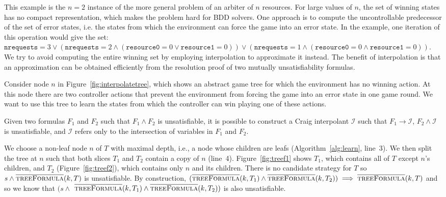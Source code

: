 This example is the $n=2$ instance of the more general problem of an arbiter of $n$ resources. For large values of $n$, the set of winning states has no compact representation, which makes the problem hard for BDD solvers. One approach is to compute the uncontrollable predecessor of the set of error states, i.e. the states from which the environment can force the game into an error state. In the example, one iteration of this operation would give the set: $\texttt{nrequests} = 3 \lor (\texttt{nrequests} = 2 \land ( \texttt{resource0} = 0 \lor \texttt{resource1} = 0)) \lor (\texttt{nrequests} = 1 \land (\texttt{resource0} = 0 \land \texttt{resource1} = 0))$. We try to avoid computing the entire winning set by employing interpolation to approximate it instead. The benefit of interpolation is that an approximation can be obtained efficiently from the resolution proof of two mutually unsatisfiability formulas.

Consider node $n$ in Figure~\ref{fig:interpolatetree}, which shows an abstract game tree for which the environment has no winning action. At this node there are two controller actions that prevent the environment from forcing the game into an error state in one game round. We want to use this tree to learn the states from which the controller can win playing one of these actions.

Given two formulas $F_1$ and $F_2$ such that $F_1 \land F_2$ is unsatisfiable, it is possible to construct a Craig interpolant $\mathcal{I}$ such that $F_1 \to \mathcal{I}$, $F_2 \land \mathcal{I}$ is unsatisfiable, and $\mathcal{I}$ refers only to the intersection of variables in $F_1$ and $F_2$. 

We choose a non-leaf node $n$ of $T$ with maximal depth, i.e., a node whose children are leafs (Algorithm~\ref{alg:learn}, line~3). We then split the tree at $n$ such that both slices $T_1$ and $T_2$ contain a copy of $n$ (line~4).  Figure~\ref{fig:treef1} shows $T_1$, which contains all of $T$ except $n$'s children, and $T_2$ (Figure~\ref{fig:treef2}), which contains only $n$ and its children.  There is no candidate strategy for $T$ so $s \land \textsc{$\overline{\mbox{treeFormula}}$}(k, T)$ is unsatisfiable.  By construction, $ (\textsc{$\overline{\mbox{treeFormula}}$}(k, T_1) \land \textsc{$\overline{\mbox{treeFormula}}$}(k, T_2)) \implies \textsc{$\overline{\mbox{treeFormula}}$}(k, T)$ and so we know that $(s \land$ $\textsc{$\overline{\mbox{treeFormula}}$}(k, T_1) \land \textsc{$\overline{\mbox{treeFormula}}$}(k, T_2))$ is also unsatisfiable.  


